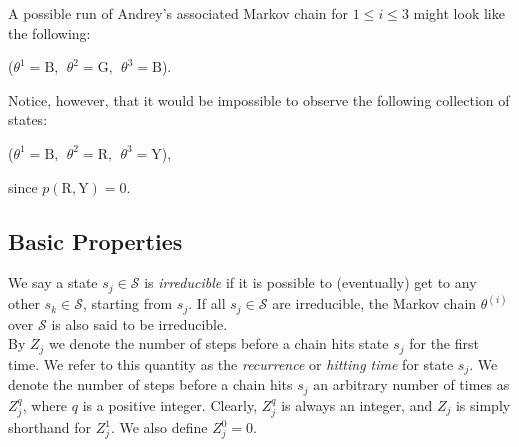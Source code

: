 \documentclass[12pt,twoside]{reedthesis}
\begin{document}
	A possible run of Andrey's associated Markov chain for $1 \leq i \leq 3$ might look like the following:
	\begin{center}
		($\theta^{1} = \textrm{B},\ \  \theta^{2} = \textrm{G},\ \ \theta^{3} = \textrm{B}$).
	\end{center}
	Notice, however, that it would be impossible to observe the following collection of states:
	\begin{center}
		($\theta^{1} = \textrm{B},\ \ \theta^{2} = \textrm{R},\ \  \theta^{3} = \textrm{Y}$),
	\end{center}
	since $p(\textrm{R}, \textrm{Y}) = 0$.

		\subsection*{Basic Properties}
		We say a state $s_j \in \mathcal{S}$ is {\em irreducible} if it is possible to (eventually) get to any other $s_k \in \mathcal{S}$, starting from $s_j$. If all $s_j \in \mathcal{S}$ are irreducible, the Markov chain $\theta^{(i)}$ over $\mathcal{S}$ is also said to be irreducible. \\
		
		By $Z_j$ we denote the number of steps before a chain hits state $s_j$ for the first time. 
		We refer to this quantity as the {\em recurrence} or {\em hitting time} for state $s_j$.
		We denote the number of steps before a chain hits $s_j$ an arbitrary number of times as $Z^{q}_j$, where $q$ is a positive integer. Clearly, $Z^{q}_j$ is always an integer, and $Z_j$ is simply shorthand for $Z^{1}_j$. We also define $Z^{0}_j = 0$. \\
		
\end{document}
